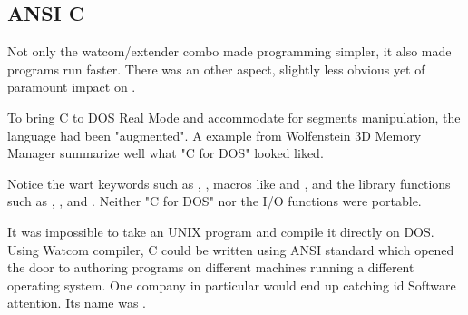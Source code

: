 \subsection{ANSI C}
Not only the watcom/extender combo made programming simpler, it also made programs run faster. There was an other aspect, slightly less obvious yet of paramount impact on \doom.\\
\par
To bring C to DOS Real Mode and accommodate for segments manipulation, the language had been "augmented". A example from Wolfenstein 3D Memory Manager summarize well what "C for DOS" looked liked.\\
\par
{}
\par
Notice the wart keywords such as , , macros like  and , and the  library functions such as , , and . Neither "C for DOS" nor the I/O functions were portable.\\
\par
 It was impossible to take an UNIX program and compile it directly on DOS. Using Watcom compiler, C could be written using ANSI standard which opened the door to authoring programs on different machines running a different operating system. One company in particular would end up catching id Software attention. Its name was \NeXT.